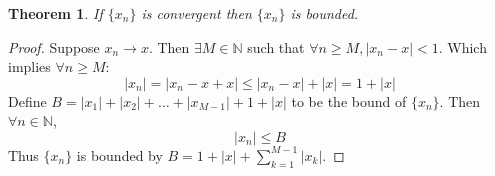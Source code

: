 \documentclass[12pt]{article}
\newtheorem{theorem}{Theorem}
\begin{document}
\begin{theorem}
    If \(\{x_n\}\) is convergent then 
    \(\{x_n\}\) is bounded.
    
\end{theorem}
\begin{proof}
     Suppose \(x_n \to x\). Then \(\exists M \in \mathbb N\) such that 
     \(\forall n \geq M, |x_n - x| < 1\). Which implies \(\forall n \geq M\):
     \[ 
        |x_n| = |x_n - x + x| \leq |x_n - x| + |x| = 1 + |x| 
     \]
     Define \(B = |x_1| + |x_2| + \dots + |x_{M-1}| + 1 + |x|\) to be 
     the bound of \(\{x_n\}\). 
     Then \(\forall n \in \mathbb N\), 
     \[ 
        |x_n| \leq B
     \]
     Thus \(\{x_n\}\) is bounded by \(B = 1 + |x| + \displaystyle\sum_{k=1}^{M-1} |x_k|\).
\end{proof}
\end{document}
